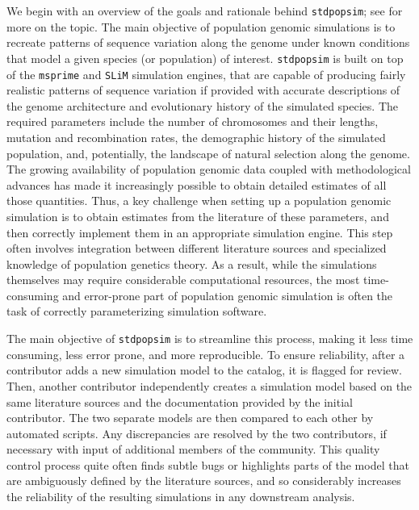 \documentclass[hidelinks]{article}
\newcommand{\Stdpopsim}{\texttt{Stdpopsim}\xspace}
\newcommand{\stdpopsim}{\texttt{stdpopsim}\xspace}
\begin{document}
We begin with an overview of the goals and rationale behind \stdpopsim;
see \citet{Adrion2020} for more on the topic.
The main objective of population genomic simulations is to recreate 
patterns of sequence variation along the genome under known conditions
that model a given species (or population) of interest.
\stdpopsim is built on top of the
\texttt{msprime} \citep{Kelleher2016,Nelson2020,Baumdicker2022}
and \texttt{SLiM} \citep{Haller2019} simulation engines,
that are capable of producing fairly realistic patterns of sequence variation
if provided with accurate descriptions of the genome architecture
and evolutionary history of the simulated species.
The required parameters include the number of chromosomes and their lengths,
mutation and recombination rates, the demographic history of the simulated population,
and, potentially, the landscape of natural selection along the genome.
The growing availability of population genomic data coupled with methodological advances
has made it increasingly possible to obtain detailed estimates of all those quantities.
Thus, a key challenge when setting up a population genomic simulation is to
obtain estimates from the literature of these parameters,
and then correctly implement them in an appropriate simulation engine.
This step often involves integration between different literature sources and
specialized knowledge of population genetics theory.
As a result, while the simulations themselves may require considerable computational resources,
the most time-consuming and error-prone part of population genomic simulation is
often the task of correctly parameterizing simulation software.

The main objective of \stdpopsim is to streamline this process,
making it less time consuming, less error prone, and more reproducible.
To ensure reliability,
after a contributor adds a new simulation model to the catalog, it is flagged for review.
Then, another contributor independently creates a simulation model
based on the same literature sources and the documentation provided by the initial contributor.
The two separate models are then compared to each other by automated scripts.
Any discrepancies are resolved by the two contributors,
if necessary with input of additional members of the community.
This quality control process quite often finds subtle bugs \citep[e.g., as in][]{Ragsdale2020}
or highlights parts of the model that are ambiguously defined by the literature sources,
and so considerably increases the reliability of the resulting simulations in any downstream analysis.
\end{document}
